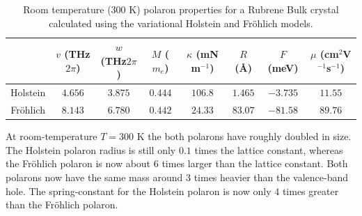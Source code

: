 \begin{table}
    \centering
    \begin{tabular}{|c|c|c|c|c|c|c|c|}
    \hline
        & $v$ (THz$2\pi$) & $w$ (THz$2\pi$) & $M$ ($m_e$) &  $\kappa$ (mN m$^{-1}$) & $R$ (Å) & $F$ (meV) & $\mu$ (cm$^2$V$^{-1}$s$^{-1}$) \\
    \hline
         Holstein & $4.656$ & $3.875$ & $0.444$ & $106.8$ & $1.465$ & $-3.735$ & $11.55$ \\
    \hline
        Fr\"ohlich & $8.143$ & $6.780$ & $0.442$ & $24.33$ & $83.07$ & $-81.58$ & $89.76$ \\
    \hline
    \end{tabular}
    \caption{Room temperature ($300$ K) polaron properties for a Rubrene Bulk crystal calculated using the variational Holstein and Fr\"ohlich models.}
    \label{tab:rubrenert}
\end{table}

At room-temperature $T = 300$ K the both polarons have roughly doubled in size. The Holstein polaron radius is still only $0.1$ times the lattice constant, whereas the Fr\"ohlich polaron is now about $6$ times larger than the lattice constant. Both polarons now have the same mass around $3$ times heavier than the valence-band hole. The spring-constant for the Holstein polaron is now only $4$ times greater than the Fr\"ohlich polaron.
\newline

